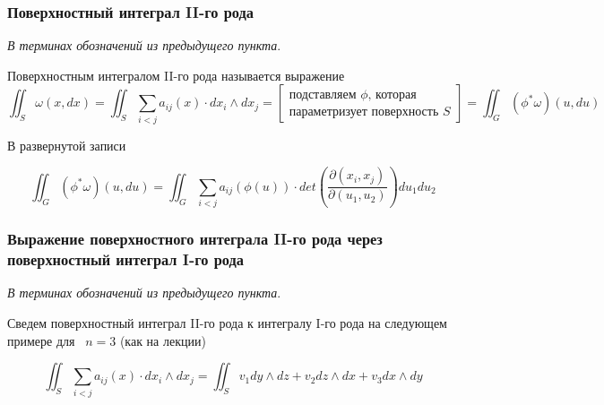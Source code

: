\subsubsection{Поверхностный интеграл II-го рода}
	
	\textit{В терминах обозначений из предыдущего пункта}.
	
	\begin{definition*} 	
			
		Поверхностным интегралом II-го рода называется выражение
		\[
			\iint_S \omega(x, dx) = \iint_S  \sum_{i<j} a_{ij}(x) \cdot dx_i \wedge dx_j = \left[ \begin{aligned} \text{подставляем $\phi$, которая} \\ \text{параметризует поверхность $S$} \end{aligned} \right] = \iint_G (\phi^* \omega) (u, du) 
		\]
		
		В развернутой записи
		
		\[
		\iint_G (\phi^* \omega) (u, du) =  \iint_G \sum_{i<j} a_{ij}(\phi(u)) \cdot 
		det \left( \frac{\partial (x_i, x_j)}{\partial (u_1, u_2)}	\right) du_1 du_2
		\]
	\end{definition*}
	

\subsubsection{Выражение поверхностного интеграла II-го рода через поверхностный интеграл I-го рода}

	\textit{В терминах обозначений из предыдущего пункта}.
	
	Сведем поверхностный интеграл II-го рода к интегралу I-го рода на следующем примере для ~$n  = 3$ (как на лекции)
	
	\[
		\iint_S  \sum_{i<j} a_{ij}(x) \cdot dx_i \wedge dx_j = \iint_S v_1 dy \wedge dz + v_2 dz \wedge dx + v_3 dx \wedge dy
	\]
	
